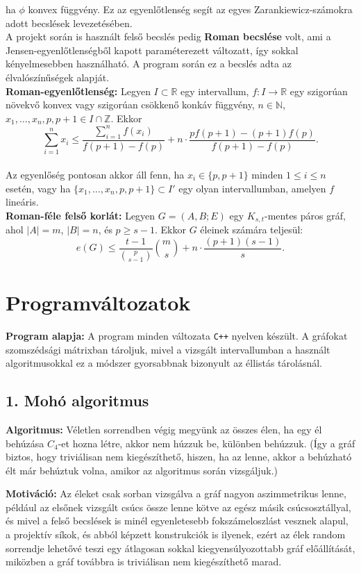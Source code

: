 \documentclass[12pt,a4paper]{article}
\begin{document}
ha $\phi$ konvex függvény. Ez az egyenlőtlenség segít az egyes Zarankiewicz-számokra adott becslések levezetésében.
\\[2mm]
A projekt során is használt felső becslés pedig \textbf{Roman becslése} volt, ami a Jensen-egyenlőtlenségből kapott paraméterezett változatt, így sokkal kényelmesebben használható. A program során ez a becslés adta az élvalószínűségek alapját.
\\[2mm]
\textbf{Roman-egyenlőtlenség:} Legyen $I \subset \mathbb{R}$ egy intervallum, $f : I \to \mathbb{R}$ egy szigorúan növekvő konvex vagy szigorúan csökkenő konkáv függvény, $n \in \mathbb{N}$, $x_1, \dots, x_n, p, p+1 \in I \cap \mathbb{Z}$. Ekkor
\[
\sum_{i=1}^{n} x_i \leq \frac{\sum_{i=1}^{n} f(x_i)}{f(p+1) - f(p)} + n \cdot \frac{p f(p+1) - (p+1) f(p)}{f(p+1) - f(p)}.
\]
\\[2mm]
Az egyenlőség pontosan akkor áll fenn, ha $x_i \in \{p, p+1\}$ minden $1 \leq i \leq n$ esetén, vagy ha $\{x_1, \dots, x_n, p, p+1\} \subset I'$ egy olyan intervallumban, amelyen $f$ lineáris.
\\[2mm]
\textbf{Roman-féle felső korlát:} Legyen $G = (A, B; E)$ egy $K_{s,t}$-mentes páros gráf, ahol $|A| = m$, $|B| = n$, és $p \geq s - 1$. Ekkor $G$ éleinek számára teljesül:
\[
e(G) \leq \frac{t - 1}{\binom{p}{s - 1}} \binom{m}{s} + n \cdot \frac{(p + 1)(s - 1)}{s}.
\]

\section*{Programváltozatok}

\textbf{Program alapja:} A program minden változata \texttt{C++} nyelven készült. A gráfokat szomszédsági mátrixban tároljuk, mivel a vizsgált intervallumban a használt algoritmusokkal ez a módszer gyorsabbnak bizonyult az éllistás tárolásnál.

\subsection*{1. Mohó algoritmus}
\textbf{Algoritmus:} Véletlen sorrendben végig megyünk az összes élen, ha egy él behúzása $C_4$-et hozna létre, akkor nem húzzuk be, különben behúzzuk. (Így a gráf biztos, hogy triviálisan nem kiegészíthető, hiszen, ha az lenne, akkor a behúzható élt már behúztuk volna, amikor az algoritmus során vizsgáljuk.)

\textbf{Motiváció:} Az éleket csak sorban vizsgálva a gráf nagyon aszimmetrikus lenne, például az elsőnek vizsgált csúcs össze lenne kötve az egész másik csúcsosztállyal, és mivel a felső becslések is minél egyenletesebb fokszámeloszlást vesznek alapul, a projektív síkok, és abból képzett konstrukciók is ilyenek, ezért az élek random sorrendje lehetővé teszi egy átlagosan sokkal kiegyensúlyozottabb gráf előállítását, miközben a gráf továbbra is triviálisan nem kiegészíthető marad.
\end{document}

